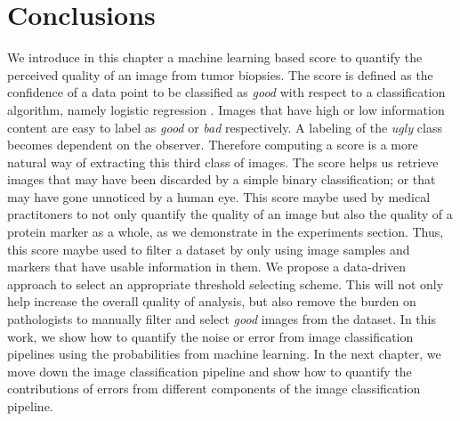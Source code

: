 \section{Conclusions}
We introduce in this chapter a machine learning based score to quantify the perceived quality of an image from tumor biopsies.  The score is defined as the confidence of a data point to be classified as \textit{good} with respect to a classification algorithm, namely logistic regression . Images that have high or low information content are easy to label as \textit{good} or \textit{bad} respectively. A labeling of the \textit{ugly} class becomes dependent on the observer. Therefore computing a score is a more natural way of extracting this third class of images. The score helps us retrieve images that may have been discarded by a simple binary classification; or that may have gone unnoticed by a human eye. This score maybe used by medical practitoners to not only quantify the quality of an image but also the quality of a protein marker as a whole, as we demonstrate in the experiments section. Thus, this score maybe used to filter a dataset by only using image samples and markers that have usable information in them. We propose a data-driven approach to select an appropriate threshold selecting scheme. This will not only help increase the overall quality of analysis, but also remove the burden on pathologists to manually filter and select \textit{good} images from the dataset.
In this work, we show how to quantify the noise or error from image classification pipelines using the probabilities from machine learning. In the next chapter, we move down the image classification pipeline and show how to quantify the contributions of errors from different components of the image classification pipeline. 